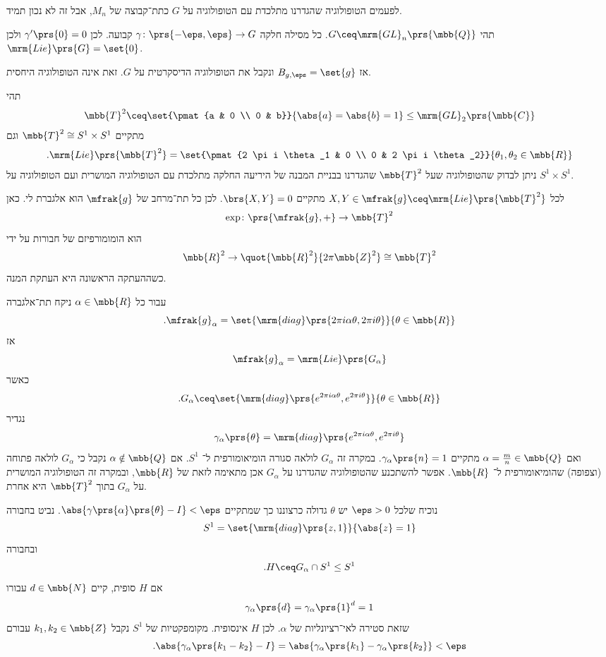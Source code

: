 \documentclass[10pt, twoside]{book}
\begin{document}
\begin{remark}
לפעמים הטופולוגיה שהגדרנו מתלכדת עם הטופולוגיה על
$G$
כתת־קבוצה של
$M_n$,
אבל זה לא נכון תמיד.
\end{remark}

\begin{example}
תהי
$G \ceq \mrm{GL}_n\prs{\mbb{Q}}$.
כל מסילה חלקה
$\gamma \colon \prs{-\eps, \eps} \to G$
קבועה.
לכן
$\gamma'\prs{0} = 0$
ולכן
$\mrm{Lie}\prs{G} = \set{0}$.

אז
$B_{g,\eps} = \set{g}$
ונקבל את הטופולוגיה הדיסקרטית על
$G$.
זאת אינה הטופולוגיה היחסית.
\end{example}

\begin{example}
תהי
\[\mbb{T}^2 \ceq \set{\pmat{a & 0 \\ 0 & b}}{\abs{a} = \abs{b} = 1} \leq \mrm{GL}_2\prs{\mbb{C}}\]
מתקיים
$\mbb{T}^2 \cong S^1 \times S^1$
וגם
\begin{align*}
\text{.} \mrm{Lie}\prs{\mbb{T}^2} = \set{\pmat{2 \pi i \theta_1 & 0 \\ 0 & 2 \pi i \theta_2}}{\theta_1, \theta_2 \in \mbb{R}}
\end{align*}
ניתן לבדוק שהטופולוגיה שעל
$\mbb{T}^2$
שהגדרנו בבניית המבנה של היריעה החלקה מתלכדת עם הטופולוגיה המושרית ועם הטופולוגיה על
$S^1 \times S^1$.

לכל
$X,Y \in \mfrak{g} \ceq \mrm{Lie}\prs{\mbb{T}^2}$
מתקיים
$\brs{X,Y} = 0$.
לכן כל תת־מרחב של
$\mfrak{g}$
הוא אלגברת לי.
כאן
\[\exp \colon \prs{\mfrak{g},+} \to \mbb{T}^2\]
הוא הומומורפיזם של חבורות על ידי
\[\mbb{R}^2 \to \quot{\mbb{R}^2}{2 \pi \mbb{Z}^2} \cong \mbb{T}^2\]
כשההעתקה הראשונה היא העתקת המנה.

עבור כל
$\alpha \in \mbb{R}$
ניקח תת־אלגברה
\[\text{.} \mfrak{g}_\alpha = \set{\mrm{diag}\prs{2 \pi i \alpha \theta, 2 \pi i \theta}}{\theta \in \mbb{R}}\]
אז
\[\mfrak{g}_\alpha = \mrm{Lie}\prs{G_\alpha}\]
כאשר
\[\text{.} G_\alpha \ceq \set{\mrm{diag}\prs{e^{2 \pi i \alpha \theta}, e^{2 \pi i \theta}}}{\theta \in \mbb{R}}\]
נגדיר
\[\gamma_\alpha\prs{\theta} = \mrm{diag}\prs{e^{2 \pi i \alpha \theta}, e^{2 \pi i \theta}}\]
ואם
$\alpha = \frac{m}{n} \in \mbb{Q}$
מתקיים
$\gamma_\alpha\prs{n} = 1$.
במקרה זה
$G_\alpha$
לולאה סגורה הומיאומורפית ל־%
$S^1$.
אם
$\alpha \notin \mbb{Q}$
נקבל כי
$G_\alpha$
לולאה פתוחה (וצפופה) שהומיאומורפית ל־%
$\mbb{R}$.
אפשר להשתכנע שהטופולוגיה שהגדרנו על
$G_\alpha$
אכן מתאימה לזאת של
$\mbb{R}$,
ובמקרה זה הטופולוגיה המושרית על
$G_\alpha$
בתוך
$\mbb{T}^2$
היא אחרת.

נוכיח שלכל
$\eps > 0$
יש
$\theta$
גדולה כרצוננו כך שמתקיים
$\abs{\gamma\prs{\alpha}\prs{\theta} - I} < \eps$.
נביט בחבורה
\[S^1 = \set{\mrm{diag}\prs{z,1}}{\abs{z} = 1}\]
ובחבורה
\[\text{.} H \ceq G_\alpha \cap S^1 \leq S^1\]
אם
$H$
סופית, קיים
$d \in \mbb{N}$
עבורו
\[\gamma_\alpha\prs{d} = \gamma_\alpha\prs{1}^d = 1\]
שזאת סטירה לאי־רציונליות של
$\alpha$.
לכן
$H$
אינסופית.
מקומפקטיות של
$S^1$
נקבל
$k_1, k_2 \in \mbb{Z}$
עבורם
\[\text{.} \abs{\gamma_\alpha\prs{k_1 - k_2} - I} = \abs{\gamma_\alpha\prs{k_1} - \gamma_\alpha\prs{k_2}} < \eps\]
\end{example}
\end{document}
